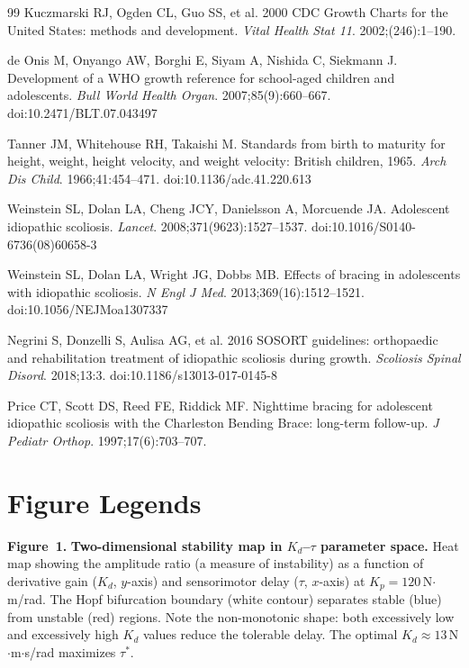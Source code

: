 \documentclass[12pt,a4paper]{article}
\begin{document}
\begin{thebibliography}{99}
Kuczmarski RJ, Ogden CL, Guo SS, et al.
2000 CDC Growth Charts for the United States: methods and development.
\textit{Vital Health Stat 11}. 2002;(246):1--190.

de Onis M, Onyango AW, Borghi E, Siyam A, Nishida C, Siekmann J.
Development of a WHO growth reference for school-aged children and adolescents.
\textit{Bull World Health Organ}. 2007;85(9):660--667.
doi:10.2471/BLT.07.043497

Tanner JM, Whitehouse RH, Takaishi M.
Standards from birth to maturity for height, weight, height velocity, and weight velocity: British children, 1965.
\textit{Arch Dis Child}. 1966;41:454--471.
doi:10.1136/adc.41.220.613

Weinstein SL, Dolan LA, Cheng JCY, Danielsson A, Morcuende JA.
Adolescent idiopathic scoliosis.
\textit{Lancet}. 2008;371(9623):1527--1537.
doi:10.1016/S0140-6736(08)60658-3

Weinstein SL, Dolan LA, Wright JG, Dobbs MB.
Effects of bracing in adolescents with idiopathic scoliosis.
\textit{N Engl J Med}. 2013;369(16):1512--1521.
doi:10.1056/NEJMoa1307337

Negrini S, Donzelli S, Aulisa AG, et al.
2016 SOSORT guidelines: orthopaedic and rehabilitation treatment of idiopathic scoliosis during growth.
\textit{Scoliosis Spinal Disord}. 2018;13:3.
doi:10.1186/s13013-017-0145-8

Price CT, Scott DS, Reed FE, Riddick MF.
Nighttime bracing for adolescent idiopathic scoliosis with the Charleston Bending Brace: long-term follow-up.
\textit{J Pediatr Orthop}. 1997;17(6):703--707.

\end{thebibliography}

\newpage
\section*{Figure Legends}

\noindent\textbf{Figure~1.} \textbf{Two-dimensional stability map in $K_d$--$\tau$ parameter space.} Heat map showing the amplitude ratio (a measure of instability) as a function of derivative gain ($K_d$, $y$-axis) and sensorimotor delay ($\tau$, $x$-axis) at $K_p = 120$\,N$\cdot$m/rad. The Hopf bifurcation boundary (white contour) separates stable (blue) from unstable (red) regions. Note the non-monotonic shape: both excessively low and excessively high $K_d$ values reduce the tolerable delay. The optimal $K_d \approx 13$\,N$\cdot$m$\cdot$s/rad maximizes $\tau^*$.
\label{fig:stability_map}
\end{document}
